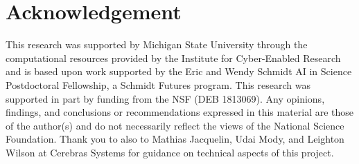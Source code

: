 \section*{Acknowledgement}

This research was supported by Michigan State University through the computational resources provided by the Institute for Cyber-Enabled Research and is based upon work supported by the Eric and Wendy Schmidt AI in Science Postdoctoral Fellowship, a Schmidt Futures program.
This research was supported in part by funding from the NSF (DEB 1813069).
Any opinions, findings, and conclusions or recommendations expressed in this material are those of the author(s) and do not necessarily reflect the views of the National Science Foundation.
Thank you to also to Mathias Jacquelin, Udai Mody, and Leighton Wilson at Cerebras Systems for guidance on technical aspects of this project.
